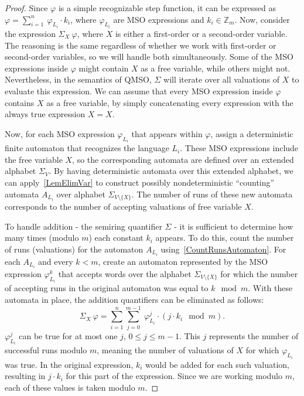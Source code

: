 \documentclass[en]{pracamgr}
\theoremstyle{definition}
\begin{document}
\begin{proof}
    Since $\varphi$ is a simple recognizable step function, it can be expressed as $\varphi = \sum_{i = 1}^{n} \ \varphi_{L_i} \cdot k_i$, where $\varphi_{L_i}$ are MSO expressions and $k_i \in \mathbb{Z}_m$. Now, consider the expression $\Sigma_{X} \ \varphi$, where $X$ is either a first-order or a second-order variable. The reasoning is the same regardless of whether we work with first-order or second-order variables, so we will handle both simultaneously. Some of the MSO expressions inside $\varphi$ might contain $X$ as a free variable, while others might not. Nevertheless, in the semantics of QMSO, $\Sigma$ will iterate over all valuations of $X$ to evaluate this expression. We can assume that every MSO expression inside $\varphi$ contains $X$ as a free variable, by simply concatenating every expression with the always true expression $X = X$.

    Now, for each MSO expression $\varphi_{L_i}$ that appears within $\varphi$, assign a deterministic finite automaton that recognizes the language $L_i$. These MSO expressions include the free variable $X$, so the corresponding automata are defined over an extended alphabet $\Sigma_V$. By having deterministic automata over this extended alphabet, we can apply~\cref{LemElimVar} to construct possibly nondeterministic ``counting'' automata $A_{L_i}$ over alphabet $\Sigma_{V \setminus \{X\}}$. The number of runs of these new automata corresponds to the number of accepting valuations of free variable $X$.

    To handle addition - the semiring quantifier $\Sigma$ - it is sufficient to determine how many times (modulo $m$) each constant $k_i$ appears. To do this, count the number of runs (valuations) for the automaton $A_{L_i}$ using~\cref{CountRunsAutomaton}. For each $A_{L_i}$ and every $k < m$, create an automaton represented by the MSO expression $\varphi_{L_i}^k$ that accepts words over the alphabet $\Sigma_{V \setminus \{X\}}$ for which the number of accepting runs in the original automaton was equal to $k \mod m$. With these automata in place, the addition quantifiers can be eliminated as follows:
    $$\Sigma_X \ \varphi = \sum_{i = 1}^n \sum_{j = 0}^{m-1} \ \varphi_{L_i}^j \cdot (j \cdot k_i \mod m).$$
    $\varphi_{L_i}^j$ can be true for at most one $j$, $0 \leq j \leq m-1$. This $j$ represents the number of successful runs modulo $m$, meaning the number of valuations of $X$ for which $\varphi_{L_i}$ was true. In the original expression, $k_i$ would be added for each such valuation, resulting in $j \cdot k_i$ for this part of the expression. Since we are working modulo $m$, each of these values is taken modulo $m$.
\end{proof}
\end{document}
